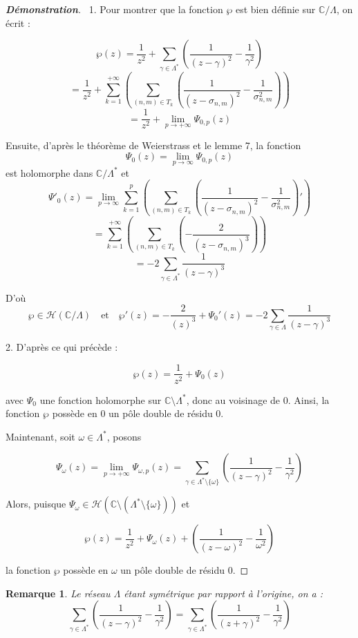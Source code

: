 \documentclass[12pt]{article}
\newtheorem{remark}{Remarque}
\begin{document}
        
        \begin{proof}[\textbf{Démonstration}] 
            \ 1. Pour montrer que la fonction \(\wp\) est bien définie sur \(\mathbb{C}/\Lambda\), on écrit :
        
        \[
        \wp(z) = \frac{1}{z^2} + \sum_{\gamma \in \Lambda^*} \left( \frac{1}{(z - \gamma)^2} - \frac{1}{\gamma^2} \right)
        \]
        \[
        = \frac{1}{z^2} + \sum_{k =1}^{ + \infty} \left( \sum_{(n,m) \in T_k} \left( \frac{1}{(z - \sigma_{n,m})^2} - \frac{1}{\sigma_{n,m}^2} \right) \right)
        \]
        \[
        = \frac{1}{z^2} + \lim_{p \to + \infty} \Psi_{0,p}(z)
        \]
        
        Ensuite, d'après le théorème de Weierstrass et le lemme 7, la fonction
        \[
        \Psi_{0}(z) = \lim_{p \to \infty} \Psi_{0,p}(z)
        \]
        est holomorphe dans \(\mathbb{C}/\Lambda^*\) et
        \[
        \Psi'_{0}(z) = \lim_{p \to \infty} \sum_{k=1}^{p} \left( \sum_{(n,m) \in T_k} \left( \frac{1}{(z - \sigma_{n,m})^2} - \frac{1}{\sigma_{n,m}^2} \right)' \right)
        \]
        \[
        = \sum_{k=1}^{ + \infty} \left( \sum_{(n,m) \in T_k} \left( -\frac{2}{(z - \sigma_{n,m})^3} \right) \right)
        \]
        \[
        = -2 \sum_{\gamma \in \Lambda^*} \frac{1}{(z - \gamma)^3}
        \]
        
        D'où
        \[
        \wp \in \mathcal{H}( \mathbb{C}/\Lambda) \quad \text{et} \quad \wp'(z) = -\frac{2}{(z)^3} + \Psi_0'(z) = -2 \sum_{\gamma \in \Lambda} \frac{1}{(z - \gamma)^3}
        \]
        
        2. D'après ce qui précède :
        
        \[
        \wp(z) = \frac{1}{z^2} + \Psi_0(z)
        \]
        
        avec \(\Psi_0\) une fonction holomorphe sur \(\mathbb{C} \setminus \Lambda^*\), donc au voisinage de 0. Ainsi, la fonction \(\wp\) possède en 0 un pôle double de résidu 0.
        
        Maintenant, soit \(\omega \in \Lambda^*\), posons
        
        \[
        \Psi_\omega(z) = \lim_{p \to +\infty} \Psi_{\omega, p}(z) = \sum_{\gamma \in \Lambda^* \setminus \{\omega\}} \left( \frac{1}{(z - \gamma)^2} - \frac{1}{\gamma^2} \right)
        \]
        
        Alors, puisque \(\Psi_\omega \in \mathcal{H}(\mathbb{C} \setminus (\Lambda^* \setminus \{\omega\}))\) et
        
        \[
        \wp(z) = \frac{1}{z^2} + \Psi_\omega(z) + \left( \frac{1}{(z - \omega)^2} - \frac{1}{\omega^2} \right)
        \]
        
        la fonction \(\wp\) possède en \(\omega\) un pôle double de résidu 0.
        \end{proof}
        \begin{remark}
            Le réseau \(\Lambda\) étant symétrique par rapport à l'origine, on a :
            \[
            \sum_{\gamma \in \Lambda^*} \left( \frac{1}{(z - \gamma)^2} - \frac{1}{\gamma^2} \right) = \sum_{\gamma \in \Lambda^*} \left( \frac{1}{(z + \gamma)^2} - \frac{1}{\gamma^2} \right)
            \]
            \end{remark}
            
\end{document}
